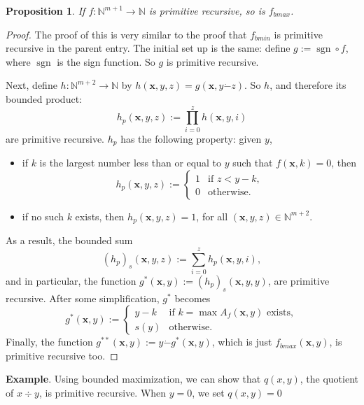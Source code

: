 \documentclass[12pt]{article}
\newtheorem{prop}{Proposition}
\begin{document}
\begin{prop}  If $f:\mathbb{N}^{m+1} \to \mathbb{N}$ is primitive recursive, so is $f_{bmax}$. \end{prop}
\begin{proof}
The proof of this is very similar to the proof that $f_{bmin}$ is primitive recursive in the parent entry.  The initial set up is the same: define $g:=\operatorname{sgn}\circ f$, where $\operatorname{sgn}$ is the sign function.  So $g$ is primitive recursive.

Next, define $h:\mathbb{N}^{m+2} \to \mathbb{N}$ by $h(\boldsymbol{x},y,z)=g(\boldsymbol{x},y\dot{-}z)$.  So $h$, and therefore its bounded product:
$$h_p(\boldsymbol{x},y,z):=\prod_{i=0}^z h(\boldsymbol{x},y,i)$$
are primitive recursive.  $h_p$ has the following property: given $y$, 
\begin{itemize}
\item if $k$ is the largest number less than or equal to $y$ such that $f(\boldsymbol{x},k)=0$, then 
\begin{displaymath}
h_p(\boldsymbol{x},y,z):= \left\{
\begin{array}{ll}
1 & \textrm{if } z < y - k, \\
0 & \textrm{otherwise.}
\end{array}
\right.
\end{displaymath}
\item if no such $k$ exists, then $h_p(\boldsymbol{x},y,z)=1$, for all $(\boldsymbol{x},y,z)\in \mathbb{N}^{m+2}$.
\end{itemize}

As a result, the bounded sum 
$$(h_p)_s(\boldsymbol{x},y,z):=\sum_{i=0}^z h_p(\boldsymbol{x},y,i),$$
and in particular, the function $g^*(\boldsymbol{x},y):=(h_p)_s(\boldsymbol{x},y,y)$, are primitive recursive.  After some simplification, $g^*$ becomes
\begin{displaymath}
g^*(\boldsymbol{x},y):= \left\{
\begin{array}{ll}
y-k & \textrm{if } k = \max A_f(\boldsymbol{x},y) \mbox{ exists}, \\
s(y) & \textrm{otherwise.}
\end{array}
\right.
\end{displaymath}
Finally, the function $g^{**}(\boldsymbol{x},y):=y\dot{-} g^*(\boldsymbol{x},y)$, which is just $f_{bmax}(\boldsymbol{x},y)$, is primitive recursive too.
\end{proof}

\textbf{Example}.  Using bounded maximization, we can show that $q(x,y)$, the quotient of $x\div y$, is primitive recursive.  When $y=0$, we set $q(x,y)=0$
\end{document}
